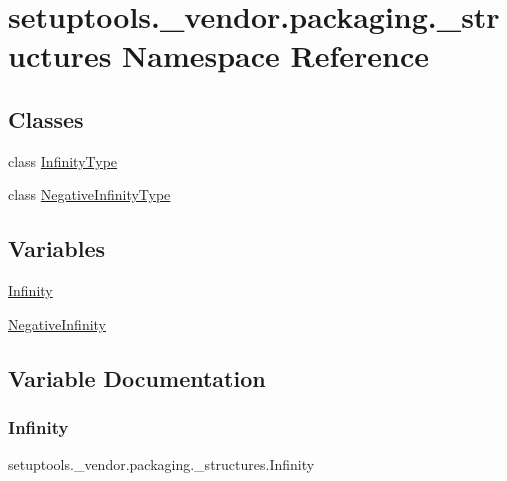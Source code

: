 \hypertarget{namespacesetuptools_1_1__vendor_1_1packaging_1_1__structures}{}\section{setuptools.\+\_\+vendor.\+packaging.\+\_\+structures Namespace Reference}
\label{namespacesetuptools_1_1__vendor_1_1packaging_1_1__structures}
\subsection*{Classes}
\begin{DoxyCompactItemize}
\item 
class \hyperlink{classsetuptools_1_1__vendor_1_1packaging_1_1__structures_1_1InfinityType}{Infinity\+Type}
\item 
class \hyperlink{classsetuptools_1_1__vendor_1_1packaging_1_1__structures_1_1NegativeInfinityType}{Negative\+Infinity\+Type}
\end{DoxyCompactItemize}
\subsection*{Variables}
\begin{DoxyCompactItemize}
\item 
\hyperlink{namespacesetuptools_1_1__vendor_1_1packaging_1_1__structures_aa94d722d0d1d33108667fb0270c188a6}{Infinity}
\item 
\hyperlink{namespacesetuptools_1_1__vendor_1_1packaging_1_1__structures_a3399602e5eb96fe48e27cff9be686e4c}{Negative\+Infinity}
\end{DoxyCompactItemize}


\subsection{Variable Documentation}
\mbox{\label{namespacesetuptools_1_1__vendor_1_1packaging_1_1__structures_aa94d722d0d1d33108667fb0270c188a6}} 
\subsubsection{\texorpdfstring{Infinity}{Infinity}}
{\footnotesize\ttfamily setuptools.\+\_\+vendor.\+packaging.\+\_\+structures.\+Infinity}

